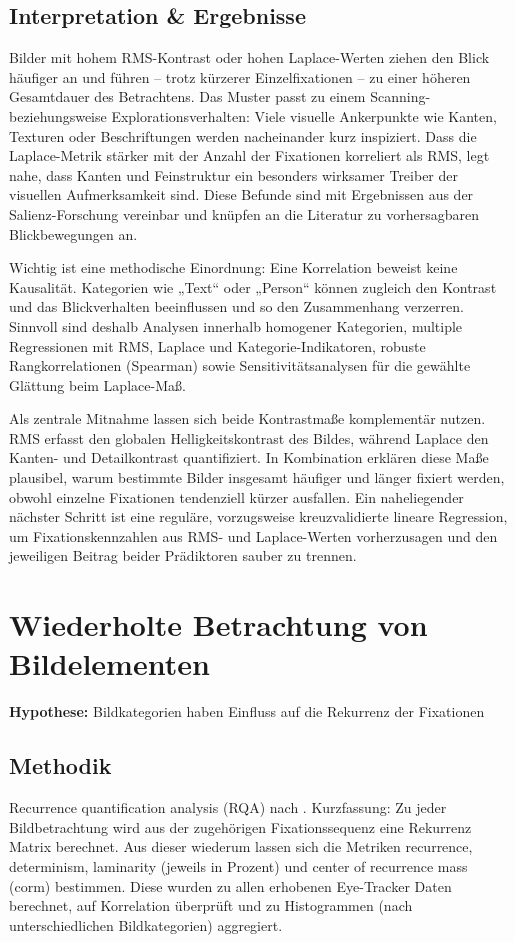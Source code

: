 \documentclass[
    language=german, %
    thesis=seminar, %
    supervisor=postdoc, %
    multiauthor=true, %
    ]{settings/csssa-thesis}
\begin{document}
\subsection{Interpretation \& Ergebnisse}
Bilder mit hohem RMS-Kontrast oder hohen Laplace-Werten ziehen den Blick häufiger an und führen – trotz kürzerer Einzel­fixationen – zu einer höheren Gesamtdauer des Betrachtens. Das Muster passt zu einem Scanning- beziehungsweise Explorationsverhalten: Viele visuelle Ankerpunkte wie Kanten, Texturen oder Beschriftungen werden nacheinander kurz inspiziert. Dass die Laplace-Metrik stärker mit der Anzahl der Fixationen korreliert als RMS, legt nahe, dass Kanten und Feinstruktur ein besonders wirksamer Treiber der visuellen Aufmerksamkeit sind. Diese Befunde sind mit Ergebnissen aus der Salienz-Forschung vereinbar und knüpfen an die Literatur zu vorhersagbaren Blickbewegungen an. 

Wichtig ist eine methodische Einordnung: Eine Korrelation beweist keine Kausalität. Kategorien wie „Text“ oder „Person“ können zugleich den Kontrast und das Blickverhalten beeinflussen und so den Zusammenhang verzerren. Sinnvoll sind deshalb Analysen innerhalb homogener Kategorien, multiple Regressionen mit RMS, Laplace und Kategorie-Indikatoren, robuste Rangkorrelationen (Spearman) sowie Sensitivitätsanalysen für die gewählte Glättung beim Laplace-Maß. 

Als zentrale Mitnahme lassen sich beide Kontrastmaße komplementär nutzen. RMS erfasst den globalen Helligkeitskontrast des Bildes, während Laplace den Kanten- und Detailkontrast quantifiziert. In Kombination erklären diese Maße plausibel, warum bestimmte Bilder insgesamt häufiger und länger fixiert werden, obwohl einzelne Fixationen tendenziell kürzer ausfallen. Ein naheliegender nächster Schritt ist eine reguläre, vorzugsweise kreuzvalidierte lineare Regression, um Fixationskennzahlen aus RMS- und Laplace-Werten vorherzusagen und den jeweiligen Beitrag beider Prädiktoren sauber zu trennen.

\section{Wiederholte Betrachtung von Bildelementen}

\textbf{Hypothese:} Bildkategorien haben Einfluss auf die Rekurrenz der Fixationen 

\subsection{Methodik}
Recurrence quantification analysis (RQA) nach \citeauthor{Anderson2013-oj}. 
Kurzfassung: Zu jeder Bildbetrachtung wird aus der zugehörigen Fixationssequenz 
eine Rekurrenz Matrix berechnet. Aus dieser wiederum lassen sich die Metriken recurrence, 
determinism, laminarity (jeweils in Prozent) und center of recurrence mass (corm) bestimmen. 
Diese wurden zu allen erhobenen Eye-Tracker Daten berechnet, auf Korrelation überprüft 
und zu Histogrammen (nach unterschiedlichen Bildkategorien) aggregiert.
\end{document}
